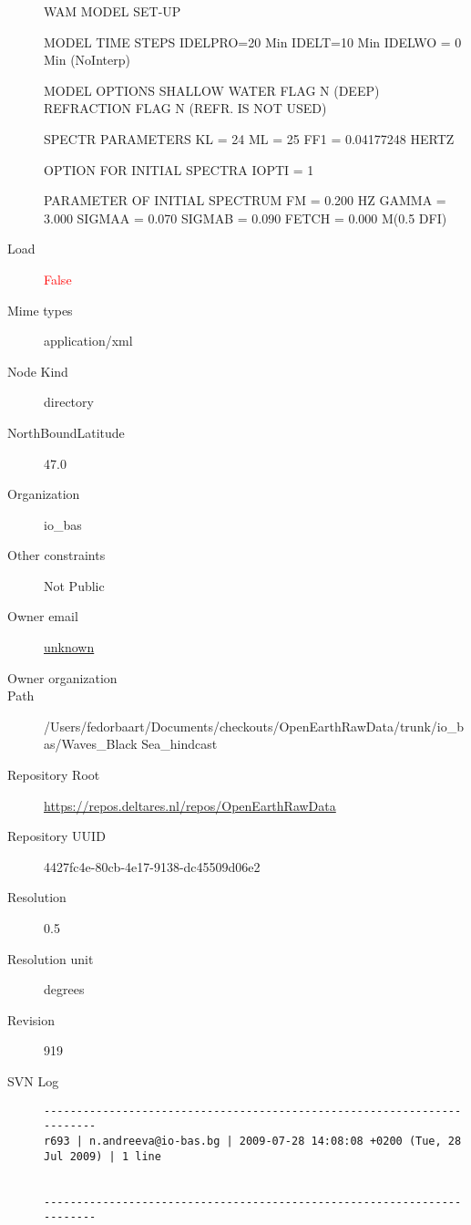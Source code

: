\documentclass[9]{report}
\begin{document}
\begin{description}
WAM MODEL SET-UP

MODEL TIME STEPS
IDELPRO=20 Min
IDELT=10 Min
IDELWO = 0 Min (NoInterp)

MODEL OPTIONS
SHALLOW WATER FLAG N (DEEP)
REFRACTION FLAG N (REFR. IS NOT USED)

SPECTR PARAMETERS
KL = 24
ML = 25
FF1 = 0.04177248 HERTZ

OPTION FOR INITIAL SPECTRA 
IOPTI = 1

PARAMETER OF INITIAL SPECTRUM   
FM = 0.200 HZ
GAMMA = 3.000
SIGMAA = 0.070
SIGMAB = 0.090
FETCH = 0.000 M(0.5 DFI)
  \item[Load] \textcolor{red}{False}
  \item[Mime types] application/xml
  \item[Node Kind] directory
  \item[NorthBoundLatitude] 47.0
  \item[Organization] io\_bas
  \item[Other constraints] Not Public
  \item[Owner email] \href{mailto:unknown}{unknown}
  \item[Owner organization] 
  \item[Path] /Users/fedorbaart/Documents/checkouts/OpenEarthRawData/trunk/io\_bas/Waves\_Black Sea\_hindcast
  \item[Repository Root] \href{https://repos.deltares.nl/repos/OpenEarthRawData}{https://repos.deltares.nl/repos/OpenEarthRawData}
  \item[Repository UUID] 4427fc4e-80cb-4e17-9138-dc45509d06e2
  \item[Resolution] 0.5
  \item[Resolution unit] degrees
  \item[Revision] 919
  \item[SVN Log] \begin{verbatim}
------------------------------------------------------------------------
r693 | n.andreeva@io-bas.bg | 2009-07-28 14:08:08 +0200 (Tue, 28 Jul 2009) | 1 line


------------------------------------------------------------------------


\end{verbatim}
\end{description}
\end{document}
